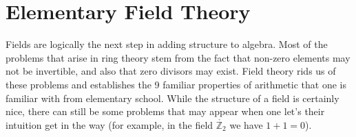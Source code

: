 \begingroup
    \ifcsname\PATH\endcsname
        \newcommand{\PATH}{books/Algebra/Fields}
        \newcommand{\OLDPATH}{\PATH}
    \else
        \newcommand{\OLDPATH}{\PATH}
        \renewcommand{\PATH}{books/Algebra/Fields}
    \fi
    \chapter{Elementary Field Theory}
    Fields are logically the next step in adding structure to algebra. Most of
    the problems that arise in ring theory stem from the fact that non-zero
    elements may not be invertible, and also that zero divisors may exist. Field
    theory rids us of these problems and establishes the 9 familiar properties
    of arithmetic that one is familiar with from elementary school. While the
    structure of a field is certainly nice, there can still be some problems
    that may appear when one let's their intuition get in the way (for example,
    in the field $\ring{\mathbb{Z}_{2}}$ we have $1+1=0$).
     
\endgroup